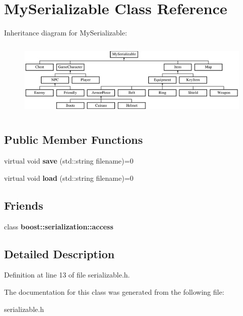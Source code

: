 \hypertarget{class_my_serializable}{}\section{My\+Serializable Class Reference}
\label{class_my_serializable}
Inheritance diagram for My\+Serializable\+:\begin{figure}[H]
\begin{center}
\leavevmode
\includegraphics[height=3.669725cm]{class_my_serializable}
\end{center}
\end{figure}
\subsection*{Public Member Functions}
\begin{DoxyCompactItemize}
\item 
\hypertarget{class_my_serializable_aecba7b7a0a257f15ccd42bcd7c320069}{}\label{class_my_serializable_aecba7b7a0a257f15ccd42bcd7c320069} 
virtual void {\bfseries save} (std\+::string filename)=0
\item 
\hypertarget{class_my_serializable_afa91367dc4d5606c1d62f5c50636e171}{}\label{class_my_serializable_afa91367dc4d5606c1d62f5c50636e171} 
virtual void {\bfseries load} (std\+::string filename)=0
\end{DoxyCompactItemize}
\subsection*{Friends}
\begin{DoxyCompactItemize}
\item 
\hypertarget{class_my_serializable_ac98d07dd8f7b70e16ccb9a01abf56b9c}{}\label{class_my_serializable_ac98d07dd8f7b70e16ccb9a01abf56b9c} 
class {\bfseries boost\+::serialization\+::access}
\end{DoxyCompactItemize}


\subsection{Detailed Description}


Definition at line 13 of file serializable.\+h.



The documentation for this class was generated from the following file\+:\begin{DoxyCompactItemize}
\item 
serializable.\+h\end{DoxyCompactItemize}
